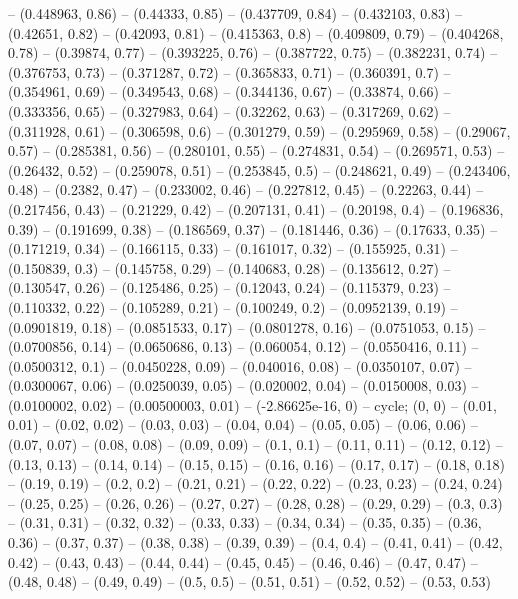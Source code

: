 -- (0.448963, 0.86)
-- (0.44333, 0.85)
-- (0.437709, 0.84)
-- (0.432103, 0.83)
-- (0.42651, 0.82)
-- (0.42093, 0.81)
-- (0.415363, 0.8)
-- (0.409809, 0.79)
-- (0.404268, 0.78)
-- (0.39874, 0.77)
-- (0.393225, 0.76)
-- (0.387722, 0.75)
-- (0.382231, 0.74)
-- (0.376753, 0.73)
-- (0.371287, 0.72)
-- (0.365833, 0.71)
-- (0.360391, 0.7)
-- (0.354961, 0.69)
-- (0.349543, 0.68)
-- (0.344136, 0.67)
-- (0.33874, 0.66)
-- (0.333356, 0.65)
-- (0.327983, 0.64)
-- (0.32262, 0.63)
-- (0.317269, 0.62)
-- (0.311928, 0.61)
-- (0.306598, 0.6)
-- (0.301279, 0.59)
-- (0.295969, 0.58)
-- (0.29067, 0.57)
-- (0.285381, 0.56)
-- (0.280101, 0.55)
-- (0.274831, 0.54)
-- (0.269571, 0.53)
-- (0.26432, 0.52)
-- (0.259078, 0.51)
-- (0.253845, 0.5)
-- (0.248621, 0.49)
-- (0.243406, 0.48)
-- (0.2382, 0.47)
-- (0.233002, 0.46)
-- (0.227812, 0.45)
-- (0.22263, 0.44)
-- (0.217456, 0.43)
-- (0.21229, 0.42)
-- (0.207131, 0.41)
-- (0.20198, 0.4)
-- (0.196836, 0.39)
-- (0.191699, 0.38)
-- (0.186569, 0.37)
-- (0.181446, 0.36)
-- (0.17633, 0.35)
-- (0.171219, 0.34)
-- (0.166115, 0.33)
-- (0.161017, 0.32)
-- (0.155925, 0.31)
-- (0.150839, 0.3)
-- (0.145758, 0.29)
-- (0.140683, 0.28)
-- (0.135612, 0.27)
-- (0.130547, 0.26)
-- (0.125486, 0.25)
-- (0.12043, 0.24)
-- (0.115379, 0.23)
-- (0.110332, 0.22)
-- (0.105289, 0.21)
-- (0.100249, 0.2)
-- (0.0952139, 0.19)
-- (0.0901819, 0.18)
-- (0.0851533, 0.17)
-- (0.0801278, 0.16)
-- (0.0751053, 0.15)
-- (0.0700856, 0.14)
-- (0.0650686, 0.13)
-- (0.060054, 0.12)
-- (0.0550416, 0.11)
-- (0.0500312, 0.1)
-- (0.0450228, 0.09)
-- (0.040016, 0.08)
-- (0.0350107, 0.07)
-- (0.0300067, 0.06)
-- (0.0250039, 0.05)
-- (0.020002, 0.04)
-- (0.0150008, 0.03)
-- (0.0100002, 0.02)
-- (0.00500003, 0.01)
-- (-2.86625e-16, 0)
-- cycle;
\drawBand (0, 0)
-- (0.01, 0.01)
-- (0.02, 0.02)
-- (0.03, 0.03)
-- (0.04, 0.04)
-- (0.05, 0.05)
-- (0.06, 0.06)
-- (0.07, 0.07)
-- (0.08, 0.08)
-- (0.09, 0.09)
-- (0.1, 0.1)
-- (0.11, 0.11)
-- (0.12, 0.12)
-- (0.13, 0.13)
-- (0.14, 0.14)
-- (0.15, 0.15)
-- (0.16, 0.16)
-- (0.17, 0.17)
-- (0.18, 0.18)
-- (0.19, 0.19)
-- (0.2, 0.2)
-- (0.21, 0.21)
-- (0.22, 0.22)
-- (0.23, 0.23)
-- (0.24, 0.24)
-- (0.25, 0.25)
-- (0.26, 0.26)
-- (0.27, 0.27)
-- (0.28, 0.28)
-- (0.29, 0.29)
-- (0.3, 0.3)
-- (0.31, 0.31)
-- (0.32, 0.32)
-- (0.33, 0.33)
-- (0.34, 0.34)
-- (0.35, 0.35)
-- (0.36, 0.36)
-- (0.37, 0.37)
-- (0.38, 0.38)
-- (0.39, 0.39)
-- (0.4, 0.4)
-- (0.41, 0.41)
-- (0.42, 0.42)
-- (0.43, 0.43)
-- (0.44, 0.44)
-- (0.45, 0.45)
-- (0.46, 0.46)
-- (0.47, 0.47)
-- (0.48, 0.48)
-- (0.49, 0.49)
-- (0.5, 0.5)
-- (0.51, 0.51)
-- (0.52, 0.52)
-- (0.53, 0.53)
